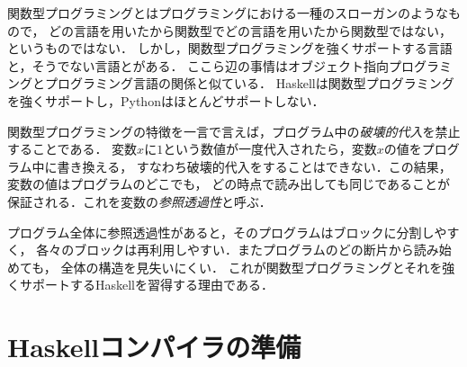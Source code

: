 \documentclass[twocolumn]{jsbook}
\newcommand{\programminglanguage}[1]{\textsf{#1}}
\newcommand{\haskell}{\programminglanguage{Haskell}}
\newcommand{\python}{\programminglanguage{Python}}
\newcommand{\keyword}[1]{{\emph{#1}}}
\begin{document}
関数型プログラミングとはプログラミングにおける一種のスローガンのようなもので，
どの言語を用いたから関数型でどの言語を用いたから関数型ではない，というものではない．
しかし，関数型プログラミングを強くサポートする言語と，そうでない言語とがある．
ここら辺の事情はオブジェクト指向プログラミングとプログラミング言語の関係と似ている．
\haskell は関数型プログラミングを強くサポートし，\python はほとんどサポートしない．

関数型プログラミングの特徴を一言で言えば，プログラム中の\keyword{破壊的代入}を禁止することである．
変数$x$に$1$という数値が一度代入されたら，変数$x$の値をプログラム中に書き換える，
すなわち破壊的代入をすることはできない．この結果，変数の値はプログラムのどこでも，
どの時点で読み出しても同じであることが保証される．これを変数の\keyword{参照透過性}と呼ぶ．

プログラム全体に参照透過性があると，そのプログラムはブロックに分割しやすく，
各々のブロックは再利用しやすい．またプログラムのどの断片から読み始めても，
全体の構造を見失いにくい．
これが関数型プログラミングとそれを強くサポートする\haskell を習得する理由である．







\section{\haskell コンパイラの準備}
\end{document}
